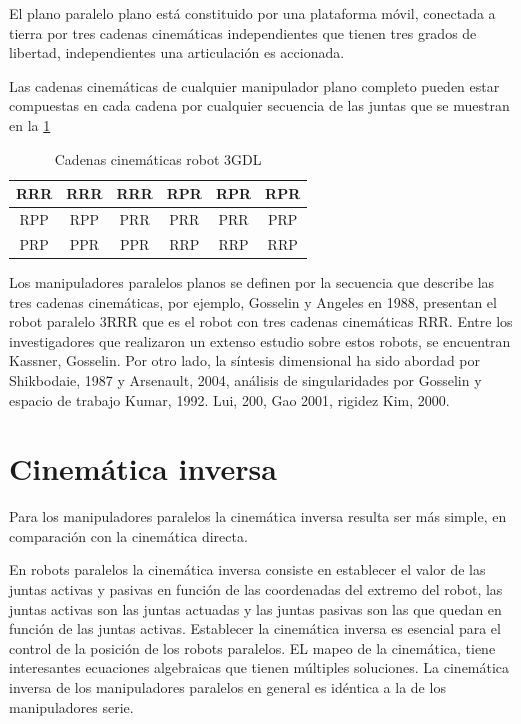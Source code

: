 \documentclass[11pt,a4paper,oldfontcommands,oneside]{memoir}
\begin{document}
El plano paralelo plano está constituido por una plataforma móvil, conectada a tierra por tres cadenas cinemáticas independientes que tienen tres grados de libertad, independientes una articulación es accionada.

Las cadenas cinemáticas de cualquier manipulador plano completo pueden estar compuestas en cada cadena por cualquier secuencia de las juntas que se muestran en la \ref {Tabla 1}

\begin{center}
\begin{table}
\begin{tabular}{|c|c|c|c|c|c|}
\hline
	RRR & RRR & RRR & RPR & RPR & RPR\\
\hline
	RPP & RPP & PRR & PRR & PRR & PRP\\
\hline
	PRP & PPR & PPR & RRP & RRP & RRP\\
\hline
\end{tabular}
\caption{Cadenas cinemáticas robot 3GDL}
\label{Tabla 1}
\end{table}
\end{center}

Los manipuladores paralelos planos se definen por la secuencia que describe las tres cadenas cinemáticas, por ejemplo, Gosselin y Angeles en 1988, presentan el robot paralelo 3RRR que es el robot con tres cadenas cinemáticas RRR. Entre los investigadores que realizaron un extenso estudio sobre estos robots, se encuentran Kassner, Gosselin. Por otro lado, la síntesis dimensional ha sido abordad por Shikbodaie, 1987 y Arsenault, 2004, análisis de singularidades por Gosselin y espacio de trabajo Kumar, 1992. Lui, 200, Gao 2001, rigidez Kim, 2000.

\chapter{Cinemática inversa}

Para los manipuladores paralelos la cinemática inversa resulta ser más simple, en comparación con la cinemática directa.

En robots paralelos la cinemática inversa consiste en establecer el valor de las juntas activas y pasivas en función de las coordenadas del extremo del robot, las juntas activas son las juntas actuadas y las juntas pasivas son las que quedan en función de las juntas activas. Establecer la cinemática inversa es esencial para el control de la posición de los robots paralelos. EL mapeo de la cinemática, tiene interesantes ecuaciones algebraicas que tienen múltiples soluciones. La cinemática inversa de los manipuladores paralelos en general es idéntica a la de los manipuladores serie.





\end{document}
